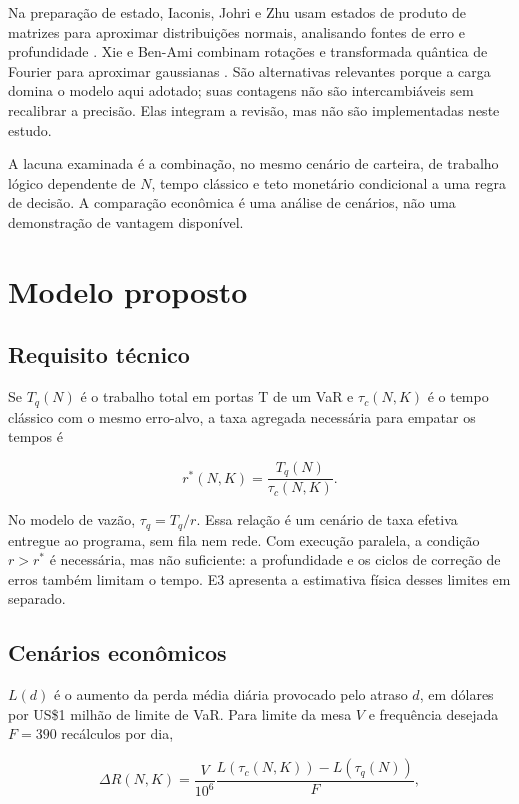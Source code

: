 \documentclass[conference,a4paper]{IEEEtran}
\begin{document}
Na preparação de estado, Iaconis, Johri e Zhu usam estados de produto de matrizes para aproximar distribuições normais, analisando fontes de erro e profundidade \cite{iaconis2024normal}. Xie e Ben-Ami combinam rotações e transformada quântica de Fourier para aproximar gaussianas \cite{xie2025gaussian}. São alternativas relevantes porque a carga domina o modelo aqui adotado; suas contagens não são intercambiáveis sem recalibrar a precisão. Elas integram a revisão, mas não são implementadas neste estudo.

A lacuna examinada é a combinação, no mesmo cenário de carteira, de trabalho lógico dependente de \(N\), tempo clássico e teto monetário condicional a uma regra de decisão. A comparação econômica é uma análise de cenários, não uma demonstração de vantagem disponível.

\section{Modelo proposto}\label{modelo-proposto}

\subsection{Requisito técnico}\label{requisito-tuxe9cnico}

Se \(T_q(N)\) é o trabalho total em portas T de um VaR e \(\tau_c(N,K)\) é o tempo clássico com o mesmo erro-alvo, a taxa agregada necessária para empatar os tempos é

\[r^*(N,K)=\frac{T_q(N)}{\tau_c(N,K)}. \tag{3}\]

No modelo de vazão, \(\tau_q=T_q/r\). Essa relação é um cenário de taxa efetiva entregue ao programa, sem fila nem rede. Com execução paralela, a condição \(r>r^*\) é necessária, mas não suficiente: a profundidade e os ciclos de correção de erros também limitam o tempo. E3 apresenta a estimativa física desses limites em separado.

\subsection{Cenários econômicos}\label{cenarios-economicos}

\(L(d)\) é o aumento da perda média diária provocado pelo atraso \(d\), em dólares por US\$1 milhão de limite de VaR. Para limite da mesa \(V\) e frequência desejada \(F=390\) recálculos por dia,

\[\Delta R(N,K)=\frac{V}{10^6}\frac{L(\tau_c(N,K))-L(\tau_q(N))}{F}, \tag{4}\]
\end{document}
